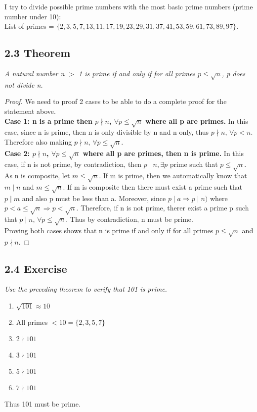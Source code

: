 \documentclass{article}
\begin{document}
I try to divide possible prime numbers with the most basic prime numbers (prime number under 10):\\
List of primes = $\{2,3,5,7,13,11,17,19,23,29,31,37,41,53,59,61,73,89,97\}$.

\subsection*{2.3 Theorem} 
\quad \textit{A natural number n $>$ 1 is prime if and only if for all primes $p \leq \sqrt{n}$, p does not divide n.}

\begin{proof}
We need to proof 2 cases to be able to do a complete proof for the statement above.\\
\textbf{Case 1: n is a prime then $p \nmid n$, $\forall p \leq \sqrt{n}$ where all p are primes.} In this case, since n is prime, then n is only divisible by n and n only, thus $p \nmid n$, $\forall p < n$. Therefore also making $p \nmid n$, $\forall p \leq \sqrt{n}$.\\
\textbf{Case 2: $p \nmid n$, $\forall p \leq \sqrt{n}$ where all p are primes, then n is prime.} In this case, if n is not prime, by contradiction, then $p \mid n, \exists p$ prime such that $p \leq \sqrt{n}$. \\
As n is composite, let $m \leq \sqrt{n}$. If m is prime, then we automatically know that $m \mid n$ and $m \leq \sqrt{n}$. If m is composite then there must exist a prime such that $p \mid m$ and also p must be less than a. Moreover, since $p \mid a \Longrightarrow p \mid n)$ where $p < a \leq \sqrt{n} \Longrightarrow p < \sqrt{n}$. Therefore, if n is not prime, therer exist a prime p such that $p \mid n$, $\forall p \leq \sqrt{n}$. Thus by contradiction, n must be prime.\\
Proving both cases shows that n is prime if and only if for all primes $p \leq \sqrt{n}$ and $p \nmid n$.
\end{proof}

\subsection*{2.4 Exercise} 
\quad \textit{Use the preceding theorem to verify that 101 is prime.}

\begin{enumerate}
    \item $\sqrt{101} \approx 10$
    \item All primes $< 10 = \{2,3,5,7\}$
    \item $2 \nmid 101$
    \item $3 \nmid 101$
    \item $5 \nmid 101$
    \item $7 \nmid 101$
\end{enumerate}
Thus 101 must be prime.
\end{document}
